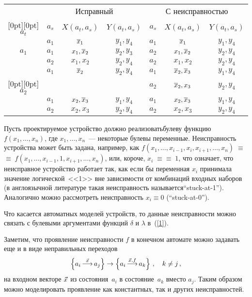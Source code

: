 \begin{multicols}{2}
\begin{table*}[b]
\begin{center}
\tabcolsep=7pt
\begin{tabular}{|c|c|c|c|c|c|c|}
\hline
\multicolumn{1}{|c|}{ } &
\multicolumn{3}{c|}{Исправный} &
\multicolumn{3}{c|}{С неисправностью} \\
\cline{2-7}
\multicolumn{1}{|c|}{\raisebox{8pt}[0pt][0pt]{$a_t$}} & $a_s$ & $X(a_t,a_s)$ & $Y(a_t,a_s)$ & $a_s$ & $X(a_t,a_s)$ &
$Y(a_t,a_s)$\\
\hline
 & $a_1$ & $\overline x_1$ & $y_1,y_4$ & $a_1$ & $\overline x_1$ & $y_1,y_4$
\\
$a_1$ & $a_1$ & $x_1,\overline x_2$ & $y_2,y_3$ & $a_2$ & $x_1,\overline x_2$ & $y_2,y_4$
\\
 & $a_2$ & $x_1,x_2$ & $y_2,y_4$ & $a_2$ & $x_1,x_2$ & $y_2,y_4$
\\
\hline
 & $a_1$ & $\overline x_2$ & $y_2,y_4$ & $a_1$ & $\overline x_2,\overline x_3$& $y_1,y_4$
\\
\multicolumn{1}{|c|}{\raisebox{-6pt}[0pt][0pt]{$a_2$}} & & & & $a_2$ & $\overline x_2,x_3$ & $y_2,y_4$
\\
 & $a_1$ & $x_2,\overline x_3$ & $y_1,y_4$ & $a_1$ & $x_2,\overline x_3$ & $y_1,y_4$
\\
 & $a_2$ & $x_2,x_3$ & $y_2,y_4$ & $a_2$ & $x_2,x_3$ & $y_2,y_4$
\\
\hline
\end{tabular}
\end{center}
\end{table*}
Пусть проектируемое устройство должно реализовать\linebreak булеву функцию
$f(x_1,\ldots,x_n)$, где $x_1,\ldots,x_n$~--- некоторые булевы переменные.
Неисправность устройства может быть задана, например, как
$f(x_1,\ldots,x_{i-1},x_i,x_{i+1},\ldots,x_n)\;\equiv$\linebreak
$\equiv\;f(x_1,\ldots,x_{i-1},1,x_{i+1},\ldots,x_n)$,
или, короче, $x_i\;\equiv$\linebreak $\equiv\;1$, что означает, что неисправное устройство работает
так, как если бы переменная $x_i$ принимала значение логической~<<1>> вне
зависимости от комбинаций входных наборов (в англоязычной литературе такая
неисправность называется\linebreak ``stuck-at-1'').
Аналогично можно рассмотреть неисправность $x_i \equiv 0$ (``stuck-at-0'').

 Что касается автоматных моделей устройств, то данные неисправности
можно связать с булевыми аргументами функций $\delta$ и $\lambda$ в~(\ref{1}).

 Заметим, что проявление неисправности $f$ в конечном автомате можно
задавать еще и в виде неправильных переходов
$$
\left \{a_i\mathop{\longrightarrow}\limits^{\v x} a_j\right \} \to
\left \{a_i\mathop{\longrightarrow}\limits^{\v x,f} a_k\right \}\,,
\quad k\ne j\,, %
$$
на входном векторе $\vec x$ из состояния~$a_i$ в состояние~$a_k$ вместо $a_j$.
Таким образом можно моделировать проявление как константных, так и других
неисправностей.


\end{multicols}
